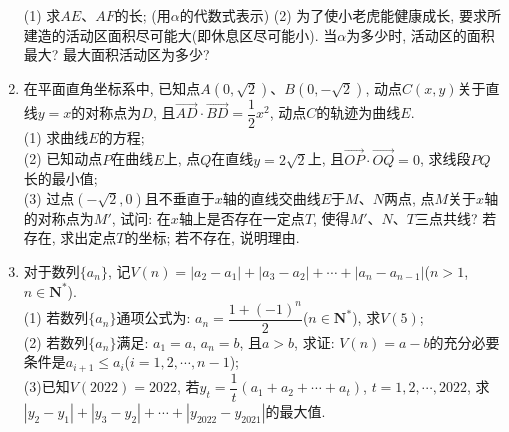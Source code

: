 \documentclass[10pt,a4paper]{article}
\begin{document}
\begin{enumerate}[1.]
\begin{center}
\end{center}
(1) 求$AE$、$AF$的长; (用$\alpha$的代数式表示)
(2) 为了使小老虎能健康成长, 要求所建造的活动区面积尽可能大(即休息区尽可能小). 当$\alpha$为多少时, 活动区的面积最大? 最大面积活动区为多少?
\item 在平面直角坐标系中, 已知点$A(0,\sqrt 2)$、$B(0,-\sqrt 2)$, 动点$C(x,y)$关于直线$y=x$的对称点为$D$, 且$\overrightarrow{AD}\cdot \overrightarrow{BD}=\dfrac 12{x^2}$, 动点$C$的轨迹为曲线$E$.\\
(1) 求曲线$E$的方程;\\
(2) 已知动点$P$在曲线$E$上, 点$Q$在直线$y=2\sqrt 2$上, 且$\overrightarrow{OP}\cdot \overrightarrow{OQ}=0$, 求线段$PQ$长的最小值;\\
(3) 过点$(-\sqrt 2,0)$且不垂直于$x$轴的直线交曲线$E$于$M$、$N$两点, 点$M$关于$x$轴的对称点为$M'$, 试问: 在$x$轴上是否存在一定点$T$, 使得$M'$、$N$、$T$三点共线? 若存在, 求出定点$T$的坐标; 若不存在, 说明理由.
\item 对于数列$\{a_n\}$, 记$V(n)=|a_2-a_1|+|a_3-a_2|+\cdots +|a_n-a_{n-1}|$($n>1$, $n\in \mathbf{N}^*$).\\
(1) 若数列$\{a_n\}$通项公式为: $a_n=\dfrac{1+(-1)^n}2$($n\in \mathbf{N}^*$), 求$V(5)$;\\
(2) 若数列$\{a_n\}$满足: $a_1=a$, $a_n=b$, 且$a>b$, 求证: $V(n)=a-b$的充分必要条件是$a_{i+1}\le a_i$($i=1,2,\cdots,n-1$);\\
(3)已知$V(2022)=2022$, 若$y_t=\dfrac 1t(a_1+a_2+\cdots +a_t)$, $t=1,2,\cdots,2022$, 求$|y_2-y_1|+|y_3-y_2|+\cdots +|y_{2022}-y_{2021}|$的最大值.


\end{enumerate}
\end{document}
